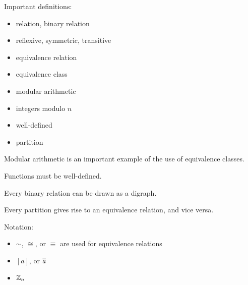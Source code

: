 \begin{summary}
\item Important definitions:
\begin{itemize}
\item relation, binary relation
\item reflexive, symmetric, transitive
\item equivalence relation
\item equivalence class
\item modular arithmetic
\item integers modulo $n$
\item well-defined
\item partition
\end{itemize}
\item Modular arithmetic is an important example of the use of equivalence classes.
\item Functions must be well-defined.
\item Every binary relation can be drawn as a digraph.
\item Every partition gives rise to an equivalence relation, and vice versa.
\item Notation:
\begin{itemize}
\item $\sim$, $\cong$, or $\equiv$ are used for equivalence relations
\item $[a]$, or $\overline{a}$
\item $\mathbb{Z}_n$
\end{itemize}
\end{summary}

 
